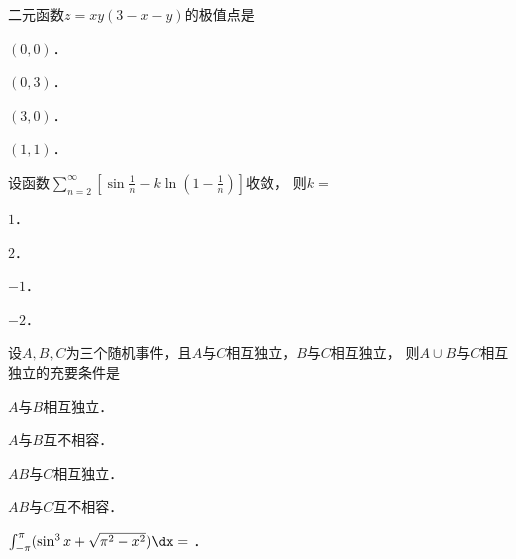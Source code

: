\documentclass[plain,noanswer,medmath]{../../template/jnuexam}
\begin{document}








\begin{problem}
二元函数$z = xy(3 - x - y)$的极值点是\pickout{}
\begin{abcd}
\item $(0,0)$．
\item $(0,3)$．
\item $(3,0)$．
\item $(1,1)$．
\end{abcd}
\end{problem}




\begin{problem}
设函数$\sum_{n = 2}^{\infty}\left[\sin\frac{1}{n} - k\ln\left(1 - \frac{1}{n}\right)\right]$收敛，
则$k =$\pickout{}
\begin{abcd}
\item $1$．
\item $2$．
\item $- 1$．
\item $- 2$．
\end{abcd}
\end{problem}






\begin{problem}
设$A,B,C$为三个随机事件，且$A$与$C$相互独立，$B$与$C$相互独立，
则$A \cup B$与$C$相互独立的充要条件是\pickout{}
\begin{abcd}
\item $A$与$B$相互独立．
\item $A$与$B$互不相容．
\item $AB$与$C$相互独立．
\item $AB$与$C$互不相容．
\end{abcd}
\end{problem}






\begin{problem}
$\int_{- \pi}^{\pi}(\sin^3 x + \sqrt{\pi^2 - x^2}) \dx =$ \fillin{}．
\end{problem}
\end{document}
